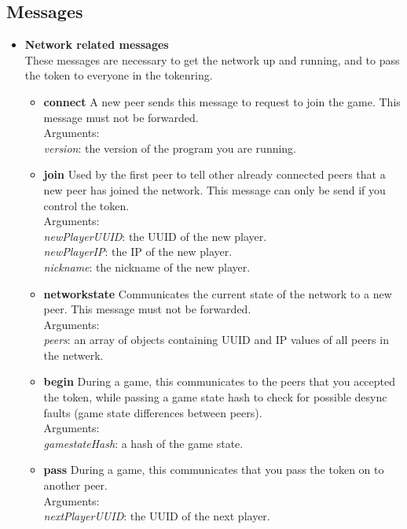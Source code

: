 \documentclass[a4paper,twoside,11pt]{article}
\begin{document}
\subsection{Messages}
\begin{itemize}
  \item \textbf{Network related messages} \\
  These messages are necessary to get the network up and running, and to pass the token to everyone in the tokenring.
    \begin{itemize}
      \item \textbf{connect}
A new peer sends this message to request to join the game. This message must not be forwarded.\\
Arguments: \\
\textit{version}: the version of the program you are running. \\

      \item \textbf{join}
Used by the first peer to tell other already connected peers that a new peer has joined the network. This message can only be send if you control the token.\\
Arguments: \\
\textit{newPlayerUUID}: the UUID of the new player. \\
\textit{newPlayerIP}: the IP of the new player. \\
\textit{nickname}: the nickname of the new player. \\

      \item \textbf{networkstate}
Communicates the current state of the network to a new peer. This message must not be forwarded.\\
Arguments: \\
\textit{peers}: an array of objects containing UUID and IP values of all peers in the netwerk. \\

      \item \textbf{begin}
During a game, this communicates to the peers that you accepted the token, while passing a game state hash to check for possible desync faults (game state differences between peers).\\
Arguments: \\
\textit{gamestateHash}: a hash of the game state. \\

      \item \textbf{pass}
During a game, this communicates that you pass the token on to another peer.\\
Arguments: \\
\textit{nextPlayerUUID}: the UUID of the next player. \\


\end{itemize}
\end{itemize}
\end{document}
